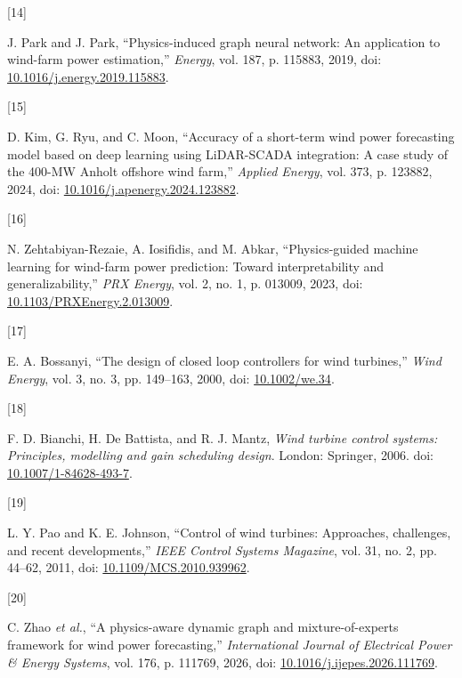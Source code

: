 \documentclass[
  journal]{IEEEtran}
\newlength{\cslhangindent}
\newlength{\csllabelwidth}
\newenvironment{CSLReferences}[2] %
 {\begin{list}{}{%
  \setlength{\itemindent}{0pt}
  \setlength{\leftmargin}{0pt}
  \setlength{\parsep}{0pt}
  \ifodd #1
   \setlength{\leftmargin}{\cslhangindent}
   \setlength{\itemindent}{-1\cslhangindent}
  \fi
  \setlength{\itemsep}{#2\baselineskip}}}
 {\end{list}}
\newcommand{\CSLLeftMargin}[1]{\parbox[t]{\csllabelwidth}{\strut#1\strut}}
\newcommand{\CSLRightInline}[1]{\parbox[t]{\linewidth - \csllabelwidth}{\strut#1\strut}}
\begin{document}
\begin{CSLReferences}{0}{0}
\CSLLeftMargin{{[}14{]} }%
\CSLRightInline{J. Park and J. Park, {``Physics-induced graph neural
network: An application to wind-farm power estimation,''} \emph{Energy},
vol. 187, p. 115883, 2019, doi:
\href{https://doi.org/10.1016/j.energy.2019.115883}{10.1016/j.energy.2019.115883}.}

\CSLLeftMargin{{[}15{]} }%
\CSLRightInline{D. Kim, G. Ryu, and C. Moon, {``Accuracy of a short-term
wind power forecasting model based on deep learning using {LiDAR-SCADA}
integration: A case study of the 400-{MW} {Anholt} offshore wind
farm,''} \emph{Applied Energy}, vol. 373, p. 123882, 2024, doi:
\href{https://doi.org/10.1016/j.apenergy.2024.123882}{10.1016/j.apenergy.2024.123882}.}

\CSLLeftMargin{{[}16{]} }%
\CSLRightInline{N. Zehtabiyan-Rezaie, A. Iosifidis, and M. Abkar,
{``Physics-guided machine learning for wind-farm power prediction:
Toward interpretability and generalizability,''} \emph{PRX Energy}, vol.
2, no. 1, p. 013009, 2023, doi:
\href{https://doi.org/10.1103/PRXEnergy.2.013009}{10.1103/PRXEnergy.2.013009}.}

\CSLLeftMargin{{[}17{]} }%
\CSLRightInline{E. A. Bossanyi, {``The design of closed loop controllers
for wind turbines,''} \emph{Wind Energy}, vol. 3, no. 3, pp. 149--163,
2000, doi: \href{https://doi.org/10.1002/we.34}{10.1002/we.34}.}

\CSLLeftMargin{{[}18{]} }%
\CSLRightInline{F. D. Bianchi, H. De Battista, and R. J. Mantz,
\emph{Wind turbine control systems: Principles, modelling and gain
scheduling design}. London: Springer, 2006. doi:
\href{https://doi.org/10.1007/1-84628-493-7}{10.1007/1-84628-493-7}.}

\CSLLeftMargin{{[}19{]} }%
\CSLRightInline{L. Y. Pao and K. E. Johnson, {``Control of wind
turbines: Approaches, challenges, and recent developments,''} \emph{IEEE
Control Systems Magazine}, vol. 31, no. 2, pp. 44--62, 2011, doi:
\href{https://doi.org/10.1109/MCS.2010.939962}{10.1109/MCS.2010.939962}.}

\CSLLeftMargin{{[}20{]} }%
\CSLRightInline{{C. Zhao \emph{et al.}}, {``A physics-aware dynamic
graph and mixture-of-experts framework for wind power forecasting,''}
\emph{International Journal of Electrical Power \& Energy Systems}, vol.
176, p. 111769, 2026, doi:
\href{https://doi.org/10.1016/j.ijepes.2026.111769}{10.1016/j.ijepes.2026.111769}.}


\end{CSLReferences}
\end{document}
